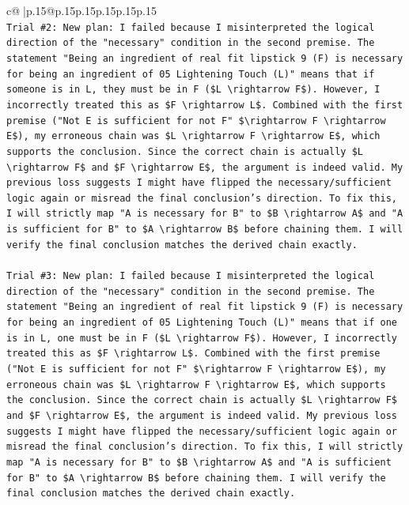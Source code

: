 \documentclass{article}
\begin{document}
{\begin{supertabular}{c@{$\;$}|p{.15\linewidth}@{}p{.15\linewidth}p{.15\linewidth}p{.15\linewidth}p{.15\linewidth}p{.15\linewidth}}
{{{\\ 
\texttt{Trial \#2: New plan: I failed because I misinterpreted the logical direction of the "necessary" condition in the second premise. The statement "Being an ingredient of real fit lipstick 9 (F) is necessary for being an ingredient of 05 Lightening Touch (L)" means that if someone is in L, they must be in F (\$L \textbackslash{}rightarrow F\$). However, I incorrectly treated this as \$F \textbackslash{}rightarrow L\$. Combined with the first premise ("Not E is sufficient for not F" \$\textbackslash{}rightarrow F \textbackslash{}rightarrow E\$), my erroneous chain was \$L \textbackslash{}rightarrow F \textbackslash{}rightarrow E\$, which supports the conclusion. Since the correct chain is actually \$L \textbackslash{}rightarrow F\$ and \$F \textbackslash{}rightarrow E\$, the argument is indeed valid. My previous loss suggests I might have flipped the necessary/sufficient logic again or misread the final conclusion's direction. To fix this, I will strictly map "A is necessary for B" to \$B \textbackslash{}rightarrow A\$ and "A is sufficient for B" to \$A \textbackslash{}rightarrow B\$ before chaining them. I will verify the final conclusion matches the derived chain exactly.} \\
\\ 
\texttt{Trial \#3: New plan: I failed because I misinterpreted the logical direction of the "necessary" condition in the second premise. The statement "Being an ingredient of real fit lipstick 9 (F) is necessary for being an ingredient of 05 Lightening Touch (L)" means that if one is in L, one must be in F (\$L \textbackslash{}rightarrow F\$). However, I incorrectly treated this as \$F \textbackslash{}rightarrow L\$. Combined with the first premise ("Not E is sufficient for not F" \$\textbackslash{}rightarrow F \textbackslash{}rightarrow E\$), my erroneous chain was \$L \textbackslash{}rightarrow F \textbackslash{}rightarrow E\$, which supports the conclusion. Since the correct chain is actually \$L \textbackslash{}rightarrow F\$ and \$F \textbackslash{}rightarrow E\$, the argument is indeed valid. My previous loss suggests I might have flipped the necessary/sufficient logic again or misread the final conclusion's direction. To fix this, I will strictly map "A is necessary for B" to \$B \textbackslash{}rightarrow A\$ and "A is sufficient for B" to \$A \textbackslash{}rightarrow B\$ before chaining them. I will verify the final conclusion matches the derived chain exactly.} \\
\\ 
}}}
\end{supertabular}}
\end{document}
